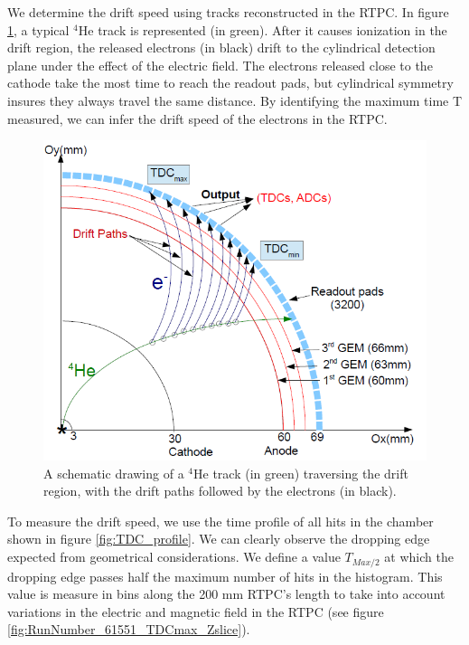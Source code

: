 \documentclass[twocolumn,showpacs,superscriptaddress,groupedaddress]{revtex4}
\begin{document}
We determine the drift speed using tracks reconstructed in the RTPC. In figure 
\ref{fig:RTPC_signals}, a typical $^{4}$He track is represented (in green). After 
it causes ionization in the drift region, the released electrons (in black) 
drift to the cylindrical detection plane under the effect of the electric field. The 
electrons released close to the cathode take the most time to reach the readout 
pads, but cylindrical symmetry insures they always travel the same 
distance. By identifying the maximum time T measured, we can infer the drift 
speed of the electrons in the RTPC.\\

\begin{figure}[tb]
\centering
\includegraphics[scale=0.35]{fig/RTPC_2.png}
\caption[]{A schematic drawing of a $^{4}$He track (in green) traversing the 
drift region, with the drift paths followed by the electrons (in black). } 
\label{fig:RTPC_signals}
\end{figure}

To measure the drift speed, we use the time profile of all hits in the 
chamber shown in figure \ref{fig:TDC_profile}. We can clearly observe the 
dropping edge expected from geometrical considerations. We define a value $T_{Max/2}$ at 
which the dropping edge passes half the maximum number of hits in the 
histogram. This value is measure in bins along the 200 mm RTPC's length to take into 
account variations in the electric and magnetic field in the RTPC (see figure 
\ref{fig:RunNumber_61551_TDCmax_Zslice}). 
\end{document}
